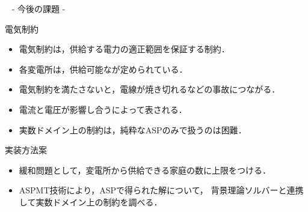 \documentclass[dvipdfmx,11pt]{beamer}
\begin{document}

\begin{frame}{~}
 \centering
 {\Large - 今後の課題 -}
\end{frame} 

\begin{frame}{電気制約}
 \begin{itemize}
  \item \alert{電気制約}は，供給する電力の適正範囲を保証する制約．
  \item 各変電所は，供給可能なが定められている．
  \item 電気制約を満たさないと，電線が焼き切れるなどの\alert{事故}につながる．
  \item 電流と電圧が影響し合うによって表される．
  \item 実数ドメイン上の制約は，純粋なASPのみで扱うのは\alert{困難}．
 \end{itemize}

\begin{alertblock}{実装方法案}
 \begin{itemize}
  \item 緩和問題として，変電所から供給できる家庭の数に上限をつける．
  \item ASPMT技術により，ASPで得られた解について，
		背景理論ソルバーと連携して実数ドメイン上の制約を調べる．
 \end{itemize}
 
\end{alertblock}

\end{frame}
\end{document}
